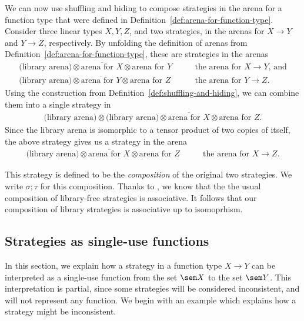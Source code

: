 We can now use shuffling and hiding to compose strategies in the arena for a function type that were defined in Definition~\ref{def:arena-for-function-type}.
Consider three linear types $X, Y, Z$, and two strategies, in the arenas for $X \to Y$ and $Y \to Z$, respectively.
 By unfolding the definition of arenas from Definition~\ref{def:arena-for-function-type}, these are strategies in the arenas 
\begin{align*}
\text{(library arena)} \otimes \overline{\text{arena for $X$}} \otimes \text{arena for $Y$} & \qquad \text{the arena for $X \to Y$, and}
\\
\text{(library arena)} \otimes \overline{\text{arena for $Y$}} \otimes \text{arena for $Z$} & \qquad \text{the arena for $Y \to Z$}.
\end{align*}
Using the construction from Definition~\ref{def:shuffling-and-hiding}, we can combine them into a single  strategy in 
\begin{align*}
\text{(library arena)} \otimes  \text{(library arena)}\otimes \overline{\text{arena for $X$}} \otimes \text{arena for $Z$}.
\end{align*}
Since the library arena is isomorphic to a tensor product of two copies of itself, the above strategy gives us a strategy in the arena 
\begin{align*}
    \text{(library arena)} \otimes   \overline{\text{arena for $X$}} \otimes \text{arena for $Z$} & \qquad \text{the arena for $X \to Z$.}
    \end{align*}

This strategy is defined to be the \emph{composition} of the original two  strategies. We write $\sigma; \tau$ for this composition. Thanks to \cite[Proposition~1.2]{abramsky2013semantics}, we know that the the usual
composition of library-free strategies is associative. It follows that our composition of library strategies is associative 
up to isomoprhism. 


\subsection{Strategies as single-use functions}
In this section, we explain how a strategy in a function type $X \to Y$ can be interpreted as a single-use function from the set  $\sem X$ to the set $\sem Y$. This interpretation is partial, since some strategies will be considered inconsistent, and will not represent any function. We begin with an example which explains how  a strategy might be inconsistent. 

